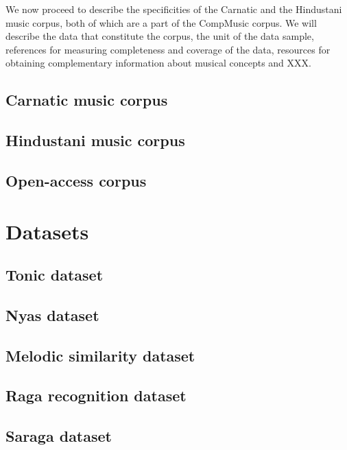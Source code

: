 We now proceed to describe the specificities of the Carnatic and the Hindustani music corpus, both of which are a part of the CompMusic corpus. We will describe the data that constitute the corpus, the unit of the data sample, references for measuring completeness and coverage of the data, resources for obtaining complementary information about musical concepts and XXX. 


\subsection{Carnatic music corpus}



\subsection{Hindustani music corpus}

\subsection{Open-access corpus}

\section{Datasets}

\subsection{Tonic dataset}

\subsection{Nyas dataset}

\subsection{Melodic similarity dataset}

\subsection{Raga recognition dataset}

\subsection{Saraga dataset}








